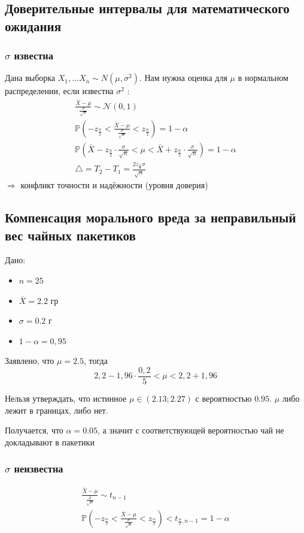 \documentclass[a4paper, 10pt]{article}
\begin{document}
\subsection{Доверительные интервалы для математического ожидания}
\subsubsection{$\sigma$ известна}
Дана выборка $X_{1}, \ldots X_{n} \sim N\left(\mu, \sigma^{2}\right)$. Нам нужна оценка для $\mu$ в нормальном распределении, если известна $\sigma^{2}$ :
$$
\begin{gathered}
\frac{\bar{X}-\mu}{\frac{\sigma}{\sqrt{n}}} \sim \mathcal{N}(0,1) \\
\mathbb{P}\left(-z_{\frac{\alpha}{2}}<\frac{\bar{X}-\mu}{\frac{\sigma}{\sqrt{n}}}<z_{\frac{\alpha}{2}}\right)=1-\alpha \\
\mathbb{P}\left(\bar{X}-z_{\frac{\alpha}{2}}\cdot\frac{\sigma}{\sqrt{n}}<\mu<\bar{X}+z_{\frac{\alpha}{2}}\cdot\frac{\sigma}{\sqrt{n}}\right)=1-\alpha \\
\triangle=T_{2}-T_{1}=\frac{2 z_{\frac{\alpha}{2}} \sigma}{\sqrt{n}}
\end{gathered}
$$
$\Longrightarrow$ конфликт точности и надёжности (уровня доверия)

\subsection{Компенсация морального вреда за неправильный вес чайных пакетиков}
Дано:
\begin{itemize}
    \item $n=25$
    \item $\overline{X}=2.2$ гр
    \item $\sigma=0.2$ г
    \item $1-\alpha=0,95$
\end{itemize}

Заявлено, что $\mu=2.5$, тогда
\begin{equation*}
    2,2-1,96 \cdot \frac{0,2}{5}<\mu<2,2+1,96
\end{equation*}

\comment Нельзя утверждать, что истинное $\mu\in(2.13;2.27)$ с вероятностью $0.95$. $\mu$ либо лежит в границах, либо нет.

Получается, что $\alpha=0.05$, а значит с соответствующей вероятностью чай не докладывают в пакетики

\subsubsection{$\sigma$ неизвестна}
\begin{equation*}
    \begin{gathered}
        \frac{\bar{X}-\mu}{\frac{\hat{\sigma}}{\sqrt{n}}} \sim t_{n-1} \\
        \mathbb{P}\left(-z_{\frac{\alpha}{2}}<\frac{\bar{X}-\mu}{\frac{\sigma}{\sqrt{n}}}<z_{\frac{\alpha}{2}}\right)<t_{\frac{\alpha}{2}, n-1}=1-\alpha
        \end{gathered}
\end{equation*}
\end{document}
